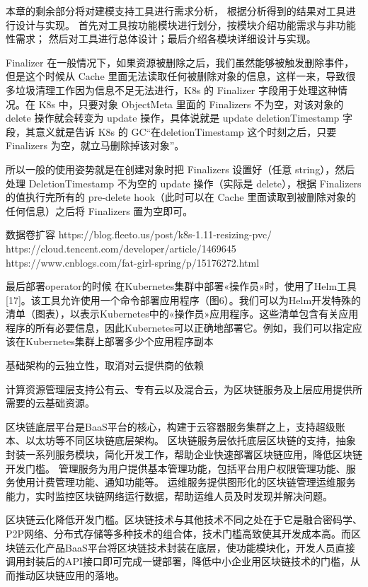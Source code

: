 本章的剩余部分将对建模支持工具进行需求分析，
根据分析得到的结果对工具进行设计与实现。
首先对工具按功能模块进行划分，按模块介绍功能需求与非功能性需求；
然后对工具进行总体设计；最后介绍各模块详细设计与实现。








Finalizer
在一般情况下，如果资源被删除之后，我们虽然能够被触发删除事件，但是这个时候从 Cache 里面无法读取任何被删除对象的信息，这样一来，导致很多垃圾清理工作因为信息不足无法进行，K8s 的 Finalizer 字段用于处理这种情况。在 K8s 中，只要对象 ObjectMeta 里面的 Finalizers 不为空，对该对象的 delete 操作就会转变为 update 操作，具体说就是 update  deletionTimestamp 字段，其意义就是告诉 K8s 的 GC“在deletionTimestamp 这个时刻之后，只要 Finalizers 为空，就立马删除掉该对象”。

所以一般的使用姿势就是在创建对象时把 Finalizers 设置好（任意 string），然后处理 DeletionTimestamp 不为空的 update 操作（实际是 delete），根据 Finalizers 的值执行完所有的 pre-delete hook（此时可以在 Cache 里面读取到被删除对象的任何信息）之后将 Finalizers 置为空即可。

数据卷扩容
https://blog.fleeto.us/post/k8s-1.11-resizing-pvc/
https://cloud.tencent.com/developer/article/1469645
https://www.cnblogs.com/fat-girl-spring/p/15176272.html


最后部署operator的时候
在Kubernetes集群中部署«操作员»时，使用了Helm工具[17]。该工具允许使用一个命令部署应用程序（图6）。我们可以为Helm开发特殊的清单（图表），以表示Kubernetes中的«操作员»应用程序。这些清单包含有关应用程序的所有必要信息，因此Kubernetes可以正确地部署它。例如，我们可以指定应该在Kubernetes集群上部署多少个应用程序副本


基础架构的云独立性，取消对云提供商的依赖

计算资源管理层支持公有云、专有云以及混合云，为区块链服务及上层应用提供所需要的云基础资源。

区块链底层平台是BaaS平台的核心，构建于云容器服务集群之上，支持超级账本、以太坊等不同区块链底层架构。
区块链服务层依托底层区块链的支持，抽象封装一系列服务模块，简化开发工作，帮助企业快速部署区块链应用，降低区块链开发门槛。
管理服务为用户提供基本管理功能，包括平台用户权限管理功能、服务使用计费管理功能、通知功能等。
运维服务提供图形化的区块链管理运维服务能力，实时监控区块链网络运行数据，帮助运维人员及时发现并解决问题。

区块链云化降低开发门槛。区块链技术与其他技术不同之处在于它是融合密码学、P2P网络、分布式存储等多种技术的组合体，技术门槛高致使其开发成本高。而区块链云化产品BaaS平台将区块链技术封装在底层，使功能模块化，开发人员直接调用封装后的API接口即可完成一键部署，降低中小企业用区块链技术的门槛，从而推动区块链应用的落地。

